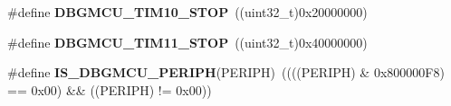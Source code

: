 \begin{DoxyCompactItemize}
\item 
\hypertarget{group__DBGMCU__Exported__Constants_ga1f0ae2f78e1f9d7eb819bf49b13b5327}{
\#define {\bfseries DBGMCU\_\-TIM10\_\-STOP}~((uint32\_\-t)0x20000000)}
\label{group__DBGMCU__Exported__Constants_ga1f0ae2f78e1f9d7eb819bf49b13b5327}

\item 
\hypertarget{group__DBGMCU__Exported__Constants_gade03e5368c3bf8a2f43fc046f1d87f30}{
\#define {\bfseries DBGMCU\_\-TIM11\_\-STOP}~((uint32\_\-t)0x40000000)}
\label{group__DBGMCU__Exported__Constants_gade03e5368c3bf8a2f43fc046f1d87f30}

\item 
\hypertarget{group__DBGMCU__Exported__Constants_ga96d44dc7861b6a3f364942704f323a45}{
\#define {\bfseries IS\_\-DBGMCU\_\-PERIPH}(PERIPH)~((((PERIPH) \& 0x800000F8) == 0x00) \&\& ((PERIPH) != 0x00))}
\label{group__DBGMCU__Exported__Constants_ga96d44dc7861b6a3f364942704f323a45}

\end{DoxyCompactItemize}
